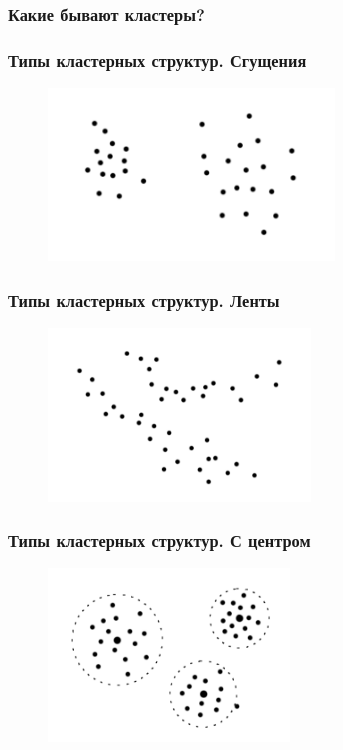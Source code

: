 \documentclass[12pt]{beamer}
\begin{document}
\begin{frame}\frametitle{Какие бывают кластеры?}
\end{frame}

\begin{frame}\frametitle{Типы кластерных структур. Сгущения}
\begin{figure}[htbp]
  \includegraphics[height=130pt, keepaspectratio = true]{images/cluster1}  
\end{figure}
\end{frame}

\begin{frame}\frametitle{Типы кластерных структур. Ленты}
\begin{figure}[htbp]
  \includegraphics[height=130pt, keepaspectratio = true]{images/cluster2}  
\end{figure}
\end{frame}

\begin{frame}\frametitle{Типы кластерных структур. С центром}
\begin{figure}[htbp]
  \includegraphics[height=130pt, keepaspectratio = true]{images/cluster3}  
\end{figure}
\end{frame}
\end{document}
